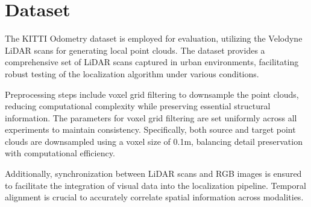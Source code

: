 \section{Dataset}
\label{sec:dataset}

The KITTI Odometry dataset \cite{Geiger2013} is employed for evaluation, utilizing the Velodyne LiDAR scans for generating local point clouds. The dataset provides a comprehensive set of LiDAR scans captured in urban environments, facilitating robust testing of the localization algorithm under various conditions.

Preprocessing steps include voxel grid filtering to downsample the point clouds, reducing computational complexity while preserving essential structural information. The parameters for voxel grid filtering are set uniformly across all experiments to maintain consistency. Specifically, both source and target point clouds are downsampled using a voxel size of 0.1m, balancing detail preservation with computational efficiency.

Additionally, synchronization between LiDAR scans and RGB images is ensured to facilitate the integration of visual data into the localization pipeline. Temporal alignment is crucial to accurately correlate spatial information across modalities.

